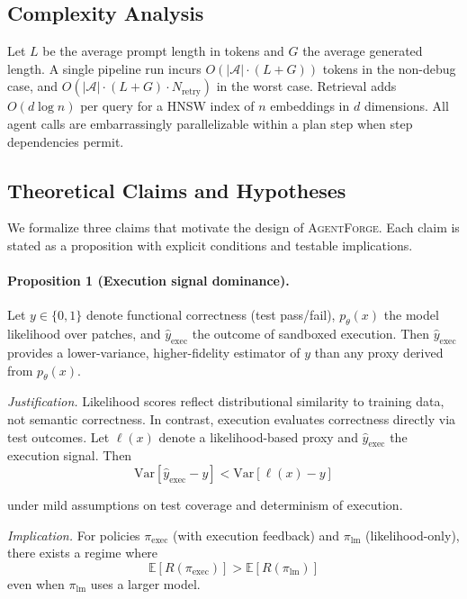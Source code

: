 \documentclass[journal]{IEEEtran}
\newcommand{\agentforge}{\textsc{AgentForge}}
\begin{document}
\subsection{Complexity Analysis}
\label{sec:complexity}

Let $L$ be the average prompt length in tokens and $G$ the average generated length. A single pipeline run incurs $O(|\mathcal{A}| \cdot (L + G))$ tokens in the non-debug case, and $O(|\mathcal{A}| \cdot (L + G) \cdot N_\text{retry})$ in the worst case. Retrieval adds $O(d \log n)$ per query for a HNSW index of $n$ embeddings in $d$ dimensions. All agent calls are embarrassingly parallelizable within a plan step when step dependencies permit.

\subsection{Theoretical Claims and Hypotheses}

We formalize three claims that motivate the design of \agentforge{}. Each claim is stated as a proposition with explicit conditions and testable implications.

\paragraph{Proposition 1 (Execution signal dominance).}
Let $y \in \{0,1\}$ denote functional correctness (test pass/fail), $p_\theta(x)$ the model likelihood over patches, and $\hat{y}_{\text{exec}}$ the outcome of sandboxed execution. Then $\hat{y}_{\text{exec}}$ provides a lower-variance, higher-fidelity estimator of $y$ than any proxy derived from $p_\theta(x)$.

\textit{Justification.}
Likelihood scores reflect distributional similarity to training data, not semantic correctness. In contrast, execution evaluates correctness directly via test outcomes. Let $\ell(x)$ denote a likelihood-based proxy and $\hat{y}_{\text{exec}}$ the execution signal. Then
\begin{equation}
    \mathrm{Var}[\hat{y}_{\text{exec}} - y] < \mathrm{Var}[\ell(x) - y]
\end{equation}

under mild assumptions on test coverage and determinism of execution.

\textit{Implication.}
For policies $\pi_{\text{exec}}$ (with execution feedback) and $\pi_{\text{lm}}$ (likelihood-only), there exists a regime where
\begin{equation}
\mathbb{E}[R(\pi_{\text{exec}})] > \mathbb{E}[R(\pi_{\text{lm}})]
\end{equation}
even when $\pi_{\text{lm}}$ uses a larger model.
\end{document}
